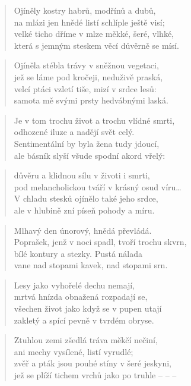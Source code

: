 \documentclass{book}
\begin{document}
\begin{verse}
Ojíněly kostry habrů, modřínů a dubů,\\
na mlázi jen hnědé listí schlíple ještě visí;\\
velké ticho dříme v mlze měkké, šeré, vlhké,\\
která s jemným steskem věcí důvěrně se mísí.
\end{verse}
\begin{verse}
Ojíněla stébla trávy v sněžnou vegetaci,\\
jež se láme pod kročeji, neduživě praská,\\
velcí ptáci vzletí tiše, mizí v srdce lesů:\\
samota mě svými prsty hedvábnými laská.
\end{verse}
\begin{verse}
Je v tom trochu život a trochu vlídné smrti,\\
odhozené iluze a nadějí svět celý.\\
Sentimentální by byla žena tudy jdoucí,\\
ale básník slyší všude spodní akord vřelý:
\end{verse}
\begin{verse}
důvěru a klidnou sílu v životi i smrti,\\
pod melancholickou tváří v krásný osud víru\ldots\\
V chladu stesků ojínělo také jeho srdce,\\
ale v hlubině zní píseň pohody a míru.
\end{verse}
\newpage
{}
\begin{verse}
Mlhavý den únorový, hnědá převládá.\\
Poprašek, jenž v noci spadl, tvoří trochu skvrn,\\
bílé kontury a stezky. Pustá nálada\\
vane nad stopami kavek, nad stopami srn.
\end{verse}
\begin{verse}
Lesy jako vyhořelé dechu nemají,\\
mrtvá hnízda obnažená rozpadají se,\\
všechen život jako když se v pupen utají\\
zakletý a spící pevně v tvrdém obryse.
\end{verse}
\begin{verse}
Ztuhlou zemi zšedlá tráva měkčí nečiní,\\
ani mechy vysílené, listí vyrudlé;\\
zvěř a pták jsou pouhé stíny v šeré jeskyni,\\
jež se plíží tichem vrchů jako po truhle -- -- --
\end{verse}
\end{document}

